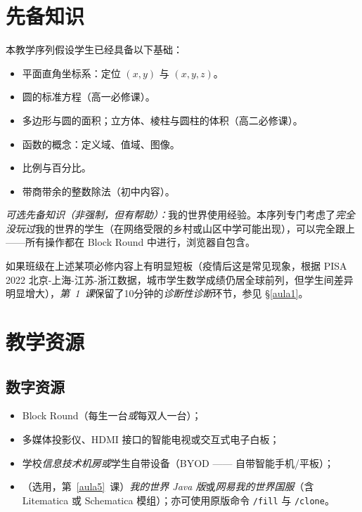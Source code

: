 \documentclass[12pt,a4paper]{scrartcl}
\newcommand{\cmd}[1]{\textcolor{earth}{\texttt{\small #1}}}
\begin{document}
\section{先备知识}\label{sec:prerrequisitos}

本教学序列假设学生已经具备以下基础：

\begin{itemize}[leftmargin=1.3em,itemsep=0.15em,topsep=0.3em]
  \item 平面直角坐标系：定位 $(x, y)$ 与 $(x, y, z)$。
  \item 圆的标准方程（高一必修课）。
  \item 多边形与圆的面积；立方体、棱柱与圆柱的体积（高二必修课）。
  \item 函数的概念：定义域、值域、图像。
  \item 比例与百分比。
  \item 带商带余的整数除法（初中内容）。
\end{itemize}

\emph{可选先备知识（非强制，但有帮助）：}我的世界使用经验。本序列专门考虑了\emph{完全没玩过}我的世界的学生（在网络受限的乡村或山区中学可能出现），可以完全跟上——所有操作都在 Block Round 中进行，浏览器自包含。

如果班级在上述某项必修内容上有明显短板（疫情后这是常见现象，根据 PISA 2022 北京-上海-江苏-浙江数据，城市学生数学成绩仍居全球前列，但学生间差异明显增大），\emph{第~1~课}保留了10分钟的\emph{诊断性诊断}环节，参见 §\ref{aula1}。

\section{教学资源}\label{sec:recursos}

\subsection{数字资源}
\begin{itemize}[leftmargin=1.3em,itemsep=0.15em,topsep=0.3em]
  \item Block Round（每生一台\emph{或}每双人一台）；
  \item 多媒体投影仪、HDMI 接口的智能电视或交互式电子白板；
  \item 学校\emph{信息技术机房}\emph{或}学生自带设备（BYOD —— 自带智能手机/平板）；
  \item （选用，第~\ref{aula5}~课）\emph{我的世界 Java 版}或\emph{网易我的世界国服}（含 Litematica 或 Schematica 模组）；亦可使用原版命令 \cmd{/fill} 与 \cmd{/clone}。
\end{itemize}
\end{document}
